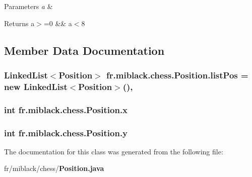 \begin{DoxyParams}{Parameters}
{\em a} & \\
\hline
\end{DoxyParams}
\begin{DoxyReturn}{Returns}
a$>$=0 \&\& a$<$8 
\end{DoxyReturn}


\subsection{Member Data Documentation}
\subsubsection[{list\-Pos}]{\setlength{\rightskip}{0pt plus 5cm}Linked\-List$<${\bf Position}$>$ fr.\-miblack.\-chess.\-Position.\-list\-Pos = new Linked\-List$<${\bf Position}$>$()\hspace{0.3cm}{\ttfamily [static]}, {\ttfamily [private]}}\label{classfr_1_1miblack_1_1chess_1_1Position_a2969a21255714dbb7ebcacb104b4a86c}
\subsubsection[{x}]{\setlength{\rightskip}{0pt plus 5cm}int fr.\-miblack.\-chess.\-Position.\-x\hspace{0.3cm}{\ttfamily [private]}}\label{classfr_1_1miblack_1_1chess_1_1Position_a1479cde5381c4b42e7efeeff29d33645}
\subsubsection[{y}]{\setlength{\rightskip}{0pt plus 5cm}int fr.\-miblack.\-chess.\-Position.\-y\hspace{0.3cm}{\ttfamily [private]}}\label{classfr_1_1miblack_1_1chess_1_1Position_a58e2521bb0bd5fb9163418ce7b0e400f}


The documentation for this class was generated from the following file\-:\begin{DoxyCompactItemize}
\item 
fr/miblack/chess/{\bf Position.\-java}\end{DoxyCompactItemize}
